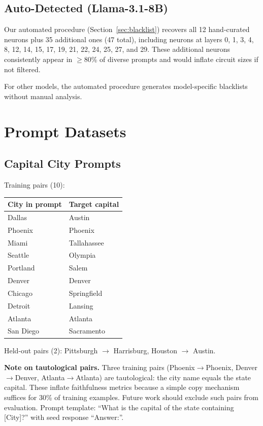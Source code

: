 \documentclass[11pt]{article}
\begin{document}
\subsection{Auto-Detected (Llama-3.1-8B)}

Our automated procedure (Section~\ref{sec:blacklist}) recovers all 12 hand-curated neurons plus 35 additional ones (47 total), including neurons at layers 0, 1, 3, 4, 8, 12, 14, 15, 17, 19, 21, 22, 24, 25, 27, and 29.
These additional neurons consistently appear in $\geq$80\% of diverse prompts and would inflate circuit sizes if not filtered.

For other models, the automated procedure generates model-specific blacklists without manual analysis.


\section{Prompt Datasets}
\label{sec:prompts}

\subsection{Capital City Prompts}

Training pairs (10):

\begin{table}[htbp]
\centering
\small
\begin{tabular}{ll}
\toprule
\textbf{City in prompt} & \textbf{Target capital} \\
\midrule
Dallas       & Austin \\
Phoenix      & Phoenix \\
Miami        & Tallahassee \\
Seattle      & Olympia \\
Portland     & Salem \\
Denver       & Denver \\
Chicago      & Springfield \\
Detroit      & Lansing \\
Atlanta      & Atlanta \\
San Diego    & Sacramento \\
\bottomrule
\end{tabular}
\end{table}

Held-out pairs (2): Pittsburgh $\to$ Harrisburg, Houston $\to$ Austin.

\textbf{Note on tautological pairs.}
Three training pairs (Phoenix$\to$Phoenix, Denver$\to$Denver, Atlanta$\to$Atlanta) are tautological: the city name equals the state capital.
These inflate faithfulness metrics because a simple copy mechanism suffices for 30\% of training examples.
Future work should exclude such pairs from evaluation.
Prompt template: ``What is the capital of the state containing [City]?'' with seed response ``Answer:''.
\end{document}
